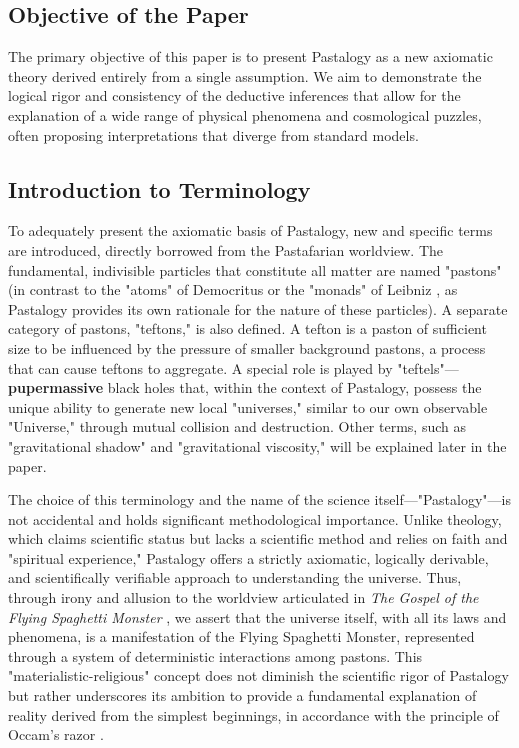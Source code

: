 \documentclass[pdflatex,sn-mathphys-num]{sn-jnl}
\begin{document}
\subsection{Objective of the Paper}\label{subsec:purpose}

The primary objective of this paper is to present Pastalogy as a new axiomatic theory derived entirely from a single assumption. We aim to demonstrate the logical rigor and consistency of the deductive inferences that allow for the explanation of a wide range of physical phenomena and cosmological puzzles, often proposing interpretations that diverge from standard models.

\subsection{Introduction to Terminology}\label{subsec:terminology}

To adequately present the axiomatic basis of Pastalogy, new and specific terms are introduced, directly borrowed from the Pastafarian worldview. The fundamental, indivisible particles that constitute all matter are named "pastons" (in contrast to the "atoms" of Democritus \cite{kirk1983-democritus} or the "monads" of Leibniz \cite{leibniz1989-monadology}, as Pastalogy provides its own rationale for the nature of these particles). A separate category of pastons, "teftons," is also defined. A tefton is a paston of sufficient size to be influenced by the pressure of smaller background pastons, a process that can cause teftons to aggregate. A special role is played by "teftels"--- \textbf{pupermassive} black holes that, within the context of Pastalogy, possess the unique ability to generate new local "universes," similar to our own observable "Universe," through mutual collision and destruction. Other terms, such as "gravitational shadow" and "gravitational viscosity," will be explained later in the paper.

The choice of this terminology and the name of the science itself---"Pastalogy"---is not accidental and holds significant methodological importance. Unlike theology, which claims scientific status but lacks a scientific method and relies on faith and "spiritual experience," Pastalogy offers a strictly axiomatic, logically derivable, and scientifically verifiable approach to understanding the universe. Thus, through irony and allusion to the worldview articulated in \textit{The Gospel of the Flying Spaghetti Monster} \cite{henderson2006}, we assert that the universe itself, with all its laws and phenomena, is a manifestation of the Flying Spaghetti Monster, represented through a system of deterministic interactions among pastons. This "materialistic-religious" concept does not diminish the scientific rigor of Pastalogy but rather underscores its ambition to provide a fundamental explanation of reality derived from the simplest beginnings, in accordance with the principle of Occam's razor \cite{occam-razor-sep}.
\end{document}
